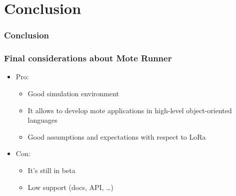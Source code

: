 \section{Conclusion} 
\begin{frame}[fragile]
  \frametitle{Conclusion}
\end{frame}

\begin{frame}[fragile]
  \frametitle{Final considerations about Mote Runner}
   \begin{itemize}
    \item Pro:
    \begin{itemize}
      \item Good simulation environment
      \item It allows to develop mote applications in high-level object-oriented languages
      \item Good assumptions and expectations with respect to LoRa
    \end{itemize}
    \item Con:
    \begin{itemize}
      \item It's still in beta
      \item Low support (docs, API, \dots)
    \end{itemize}
  \end{itemize}
\end{frame}
